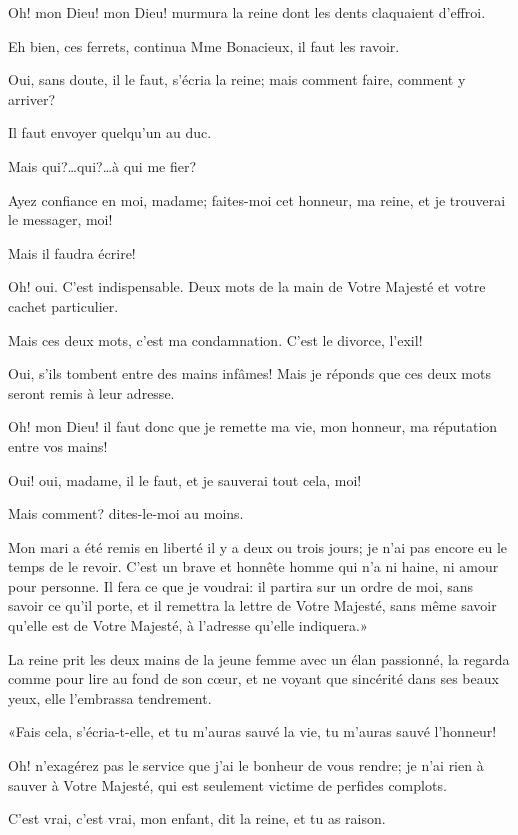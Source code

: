 \speak  Oh! mon Dieu! mon Dieu! murmura la reine dont les dents claquaient d'effroi. 

\speak  Eh bien, ces ferrets, continua Mme Bonacieux, il faut les ravoir. 

\speak  Oui, sans doute, il le faut, s'écria la reine; mais comment faire, comment y arriver? 

\speak  Il faut envoyer quelqu'un au duc. 

\speak  Mais qui?\dots qui?\dots à qui me fier? 

\speak  Ayez confiance en moi, madame; faites-moi cet honneur, ma reine, et je trouverai le messager, moi! 

\speak  Mais il faudra écrire! 

\speak  Oh! oui. C'est indispensable. Deux mots de la main de Votre Majesté et votre cachet particulier. 

\speak  Mais ces deux mots, c'est ma condamnation. C'est le divorce, l'exil! 

\speak  Oui, s'ils tombent entre des mains infâmes! Mais je réponds que ces deux mots seront remis à leur adresse. 

\speak  Oh! mon Dieu! il faut donc que je remette ma vie, mon honneur, ma réputation entre vos mains! 

\speak  Oui! oui, madame, il le faut, et je sauverai tout cela, moi! 

\speak  Mais comment? dites-le-moi au moins. 

\speak  Mon mari a été remis en liberté il y a deux ou trois jours; je n'ai pas encore eu le temps de le revoir. C'est un brave et honnête homme qui n'a ni haine, ni amour pour personne. Il fera ce que je voudrai: il partira sur un ordre de moi, sans savoir ce qu'il porte, et il remettra la lettre de Votre Majesté, sans même savoir qu'elle est de Votre Majesté, à l'adresse qu'elle indiquera.» 

La reine prit les deux mains de la jeune femme avec un élan passionné, la regarda comme pour lire au fond de son cœur, et ne voyant que sincérité dans ses beaux yeux, elle l'embrassa tendrement. 

«Fais cela, s'écria-t-elle, et tu m'auras sauvé la vie, tu m'auras sauvé l'honneur! 

\speak  Oh! n'exagérez pas le service que j'ai le bonheur de vous rendre; je n'ai rien à sauver à Votre Majesté, qui est seulement victime de perfides complots. 

\speak  C'est vrai, c'est vrai, mon enfant, dit la reine, et tu as raison. 

